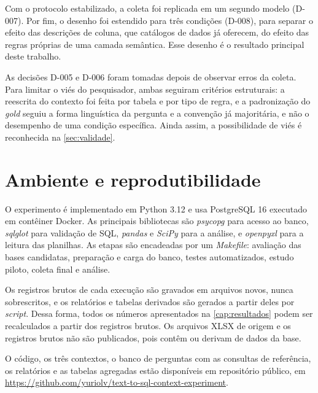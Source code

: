 Com o protocolo estabilizado, a coleta foi replicada em um segundo modelo
(D-007). Por fim, o desenho foi estendido para três condições (D-008), para
separar o efeito das descrições de coluna, que catálogos de dados já
oferecem, do efeito das regras próprias de uma camada semântica. Esse
desenho é o resultado principal deste trabalho.

As decisões D-005 e D-006 foram tomadas depois de observar erros da
coleta. Para limitar o viés do pesquisador, ambas seguiram critérios
estruturais: a reescrita do contexto foi feita por tabela e por tipo de
regra, e a padronização do \textit{gold} seguiu a forma linguística da
pergunta e a convenção já majoritária, e não o desempenho de uma condição
específica. Ainda assim, a possibilidade de viés é reconhecida na
\autoref{sec:validade}.

\section{Ambiente e reprodutibilidade}
\label{sec:reprodutibilidade}

O experimento é implementado em Python 3.12 e usa PostgreSQL 16
\cite{postgresql16} executado em contêiner Docker. As principais
bibliotecas são \textit{psycopg} para acesso ao banco, \textit{sqlglot}
\cite{sqlglot} para validação de SQL, \textit{pandas} \cite{pandas2010} e
\textit{SciPy} para a análise, e \textit{openpyxl} para a leitura das
planilhas. As etapas são encadeadas por um \textit{Makefile}: avaliação das
bases candidatas, preparação e carga do banco, testes automatizados, estudo
piloto, coleta final e análise.

Os registros brutos de cada execução são gravados em arquivos novos, nunca
sobrescritos, e os relatórios e tabelas derivados são gerados a partir
deles por \textit{script}. Dessa forma, todos os números apresentados na
\autoref{cap:resultados} podem ser recalculados a partir dos registros
brutos. Os arquivos XLSX de origem e os registros brutos não são
publicados, pois contêm ou derivam de dados da base.

O código, os três contextos, o banco de perguntas com as consultas de
referência, os relatórios e as tabelas agregadas estão disponíveis em
repositório público, em
\url{https://github.com/yuriolv/text-to-sql-context-experiment}.
